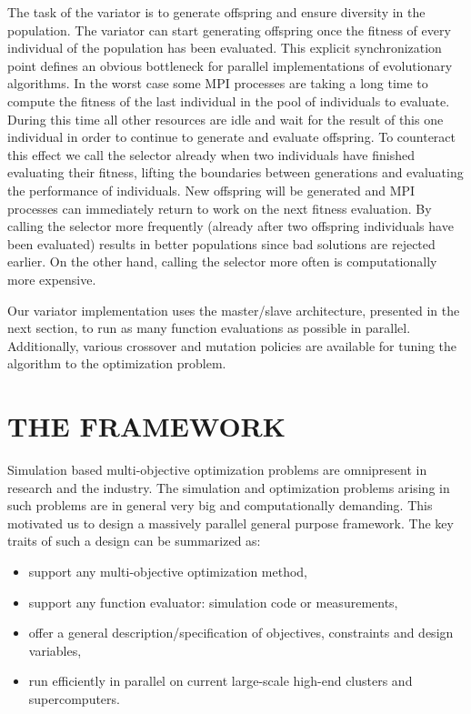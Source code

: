 \documentclass[%
reprint,
amsmath,amssymb,
aps,
]{revtex4-1}
\begin{document}
The task of the variator is to generate offspring and ensure diversity in the
  population.
The variator can start generating offspring once the fitness of every
  individual of the population has been evaluated.
This explicit synchronization point defines an obvious bottleneck for parallel
  implementations of evolutionary algorithms.
In the worst case some MPI processes are taking a long time to compute the
  fitness of the last individual in the pool of individuals to evaluate.
During this time all other resources are idle and wait for the result of
  this one individual in order to continue to generate and evaluate offspring.
To counteract this effect we call the selector already when two individuals
  have finished evaluating their fitness, lifting the boundaries between
  generations and evaluating the performance of individuals.
New offspring will be generated and MPI processes can immediately return to
  work on the next fitness evaluation.
By calling the selector more frequently (already after two offspring
  individuals have been evaluated) results in better populations since bad
  solutions are rejected earlier.
On the other hand, calling the selector more often is computationally more
  expensive.

Our variator implementation uses the master/slave architecture, presented in
  the next section, to run as many function evaluations as possible in parallel.
Additionally, various crossover and mutation policies are available for tuning
  the algorithm to the optimization problem.



\section{THE FRAMEWORK} \label{sec:framework}

Simulation based multi-objective optimization problems are omnipresent in
  research and the industry.
The simulation and optimization problems arising in such problems are in
  general very big and computationally demanding.
This motivated us to design a massively parallel general purpose framework.
The key traits of such a design can be summarized as:
%
\begin{itemize}
  \item support any multi-objective optimization method,
  \item support any function evaluator: simulation code or measurements,
  \item offer a general description/specification of objectives, constraints
        and design variables,
  \item run efficiently in parallel on current large-scale high-end clusters
        and supercomputers.
\end{itemize}
%
\end{document}

